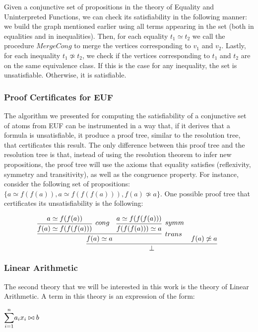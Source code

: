 Given a conjunctive set of propositions in the theory of Equality and Uninterpreted Functions, we can check
its satisfiability in the following manner: we build the graph mentioned earlier using
all terms appearing in the set (both in equalities and in inequalities). Then, for
each equality $t_{1} \simeq t_{2}$ we call the procedure $MergeCong$ to merge the vertices corresponding to $v_{1}$ and $v_{2}$.
Lastly, for each inequality $t_{1} \not\simeq t_{2}$, we check if the vertices corresponding to $t_{1}$ and $t_{2}$ are on the same equivalence class. If this is the case for any inequality, the set is unsatisfiable. Otherwise, it is satisfiable.

\subsubsection{Proof Certificates for EUF}

The algorithm we presented for computing the satisfiability of a conjunctive set of
atoms from EUF can be instrumented in a way that, if it derives that a formula is
unsatisfiable, it produce a proof tree, similar to the resolution tree, that
certificates this result.
The only difference between this proof tree and the resolution tree is that, instead of using the resolution theorem to infer new propositions, the proof tree will use the axioms that equality satisfies (reflexivity, symmetry and transitivity), as well as the congruence property. For instance, consider the following set of propositions: $\{a \simeq f(f(a)), a \simeq f(f(f(a))), f(a) \not\simeq a\}$. One possible proof tree that certificates its unsatisfiability is the following:

\[
  \infer[]{\bot}{\infer[trans]{f(a) \simeq a}{\infer[cong]{f(a) \simeq f(f(f(a)))}{a \simeq f(f(a))} & \infer[symm]{f(f(f(a))) \simeq a}{a \simeq f(f(f(a)))}} & f(a) \not\simeq a}
\]

\subsubsection{Linear Arithmetic}

The second theory that we will be interested in this work is the theory of Linear Arithmetic. A term in this theory is an expression of the form:
\begin{center}
  $\mathlarger{\sum}_{i = 1}^{n} a_{i} x_{i} \bowtie b$
\end{center}

